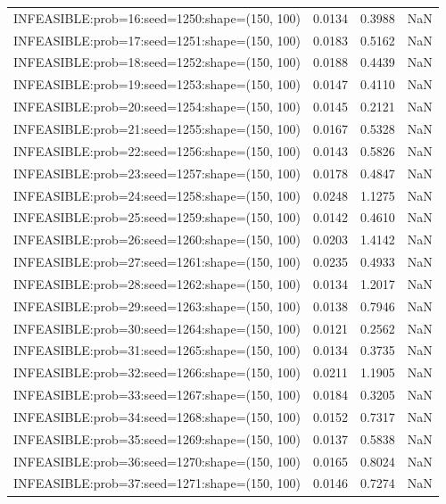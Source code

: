 \begin{longtable}{lccc}
INFEASIBLE:prob=16:seed=1250:shape=(150, 100)  &   0.0134 &  0.3988 &    NaN \\
INFEASIBLE:prob=17:seed=1251:shape=(150, 100)  &   0.0183 &  0.5162 &    NaN \\
INFEASIBLE:prob=18:seed=1252:shape=(150, 100)  &   0.0188 &  0.4439 &    NaN \\
INFEASIBLE:prob=19:seed=1253:shape=(150, 100)  &   0.0147 &  0.4110 &    NaN \\
INFEASIBLE:prob=20:seed=1254:shape=(150, 100)  &   0.0145 &  0.2121 &    NaN \\
INFEASIBLE:prob=21:seed=1255:shape=(150, 100)  &   0.0167 &  0.5328 &    NaN \\
INFEASIBLE:prob=22:seed=1256:shape=(150, 100)  &   0.0143 &  0.5826 &    NaN \\
INFEASIBLE:prob=23:seed=1257:shape=(150, 100)  &   0.0178 &  0.4847 &    NaN \\
INFEASIBLE:prob=24:seed=1258:shape=(150, 100)  &   0.0248 &  1.1275 &    NaN \\
INFEASIBLE:prob=25:seed=1259:shape=(150, 100)  &   0.0142 &  0.4610 &    NaN \\
INFEASIBLE:prob=26:seed=1260:shape=(150, 100)  &   0.0203 &  1.4142 &    NaN \\
INFEASIBLE:prob=27:seed=1261:shape=(150, 100)  &   0.0235 &  0.4933 &    NaN \\
INFEASIBLE:prob=28:seed=1262:shape=(150, 100)  &   0.0134 &  1.2017 &    NaN \\
INFEASIBLE:prob=29:seed=1263:shape=(150, 100)  &   0.0138 &  0.7946 &    NaN \\
INFEASIBLE:prob=30:seed=1264:shape=(150, 100)  &   0.0121 &  0.2562 &    NaN \\
INFEASIBLE:prob=31:seed=1265:shape=(150, 100)  &   0.0134 &  0.3735 &    NaN \\
INFEASIBLE:prob=32:seed=1266:shape=(150, 100)  &   0.0211 &  1.1905 &    NaN \\
INFEASIBLE:prob=33:seed=1267:shape=(150, 100)  &   0.0184 &  0.3205 &    NaN \\
INFEASIBLE:prob=34:seed=1268:shape=(150, 100)  &   0.0152 &  0.7317 &    NaN \\
INFEASIBLE:prob=35:seed=1269:shape=(150, 100)  &   0.0137 &  0.5838 &    NaN \\
INFEASIBLE:prob=36:seed=1270:shape=(150, 100)  &   0.0165 &  0.8024 &    NaN \\
INFEASIBLE:prob=37:seed=1271:shape=(150, 100)  &   0.0146 &  0.7274 &    NaN \\

\end{longtable}
